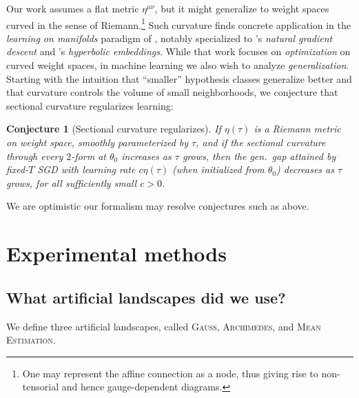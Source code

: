 \documentclass{article}
\theoremstyle{plain}
\newtheorem{conj}{Conjecture}
\theoremstyle{definition}
\newcommand{\Gauss}{\textsc{Gauss}}
\newcommand{\Archimedes}{\textsc{Archimedes}}
\newcommand{\MeanEstimation}{\textsc{Mean Estimation}}
\begin{document}
        Our work assumes a flat metric $\eta^{\mu\nu}$, but it might
        generalize to weight spaces curved in the sense of Riemann.\footnote{
            One may represent the affine connection as a node, thus giving
            rise to non-tensorial and hence gauge-dependent diagrams.
        }  Such curvature finds concrete application in the \emph{learning on
        manifolds} paradigm of \cite{ab07, zh16}, notably specialized to
        \cite{am98}'s \emph{natural gradient descent} and \cite{ni17}'s
        \emph{hyperbolic embeddings}.  While that work focuses on
        \emph{optimization} on curved weight spaces, in machine learning we
        also wish to analyze \emph{generalization}.
        Starting with the intuition that ``smaller'' hypothesis classes
        generalize better and that curvature controls the volume of small
        neighborhoods, we conjecture that sectional curvature regularizes
        learning:
        \begin{conj}[Sectional curvature regularizes]
            If $\eta(\tau)$ is a Riemann metric on weight space, smoothly
            parameterized by $\tau$, and if the sectional curvature through
            every $2$-form at $\theta_0$ increases as $\tau$ grows, then
            the gen.\ gap attained by fixed-$T$ SGD with learning rate $c
            \eta(\tau)$ (when initialized from $\theta_0$) decreases as $\tau$
            grows, for all sufficiently small $c>0$.
        \end{conj}
        We are optimistic our formalism may resolve conjectures such as above.


\newpage
\section{Experimental methods}\label{appendix:experiments}

    \subsection{What artificial landscapes did we use?}             \label{appendix:artificial}

        We define three artificial landscapes, called
        \Gauss, \Archimedes, and \MeanEstimation.
\end{document}
